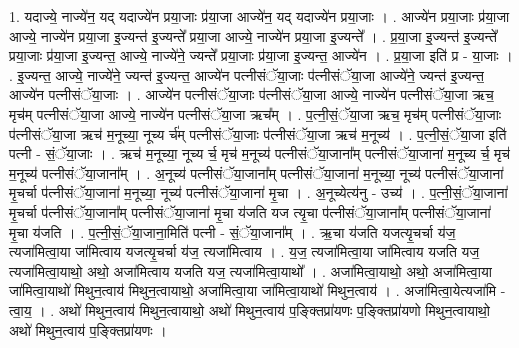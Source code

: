 \documentclass[17pt]{extarticle}
\begin{document}
1. यदाज्ये॒ नाज्ये॑न॒ यद् यदाज्ये॑न प्रया॒जाः प्र॑या॒जा आज्ये॑न॒ यद् यदाज्ये॑न प्रया॒जाः । . आज्ये॑न प्रया॒जाः प्र॑या॒जा आज्ये॒ नाज्ये॑न प्रया॒जा इ॒ज्यन्त॑ इ॒ज्यन्ते᳚ प्रया॒जा आज्ये॒ नाज्ये॑न प्रया॒जा इ॒ज्यन्ते᳚ । . प्र॒या॒जा इ॒ज्यन्त॑ इ॒ज्यन्ते᳚ प्रया॒जाः प्र॑या॒जा इ॒ज्यन्त॒ आज्ये॒ नाज्ये॑ने॒ ज्यन्ते᳚ प्रया॒जाः प्र॑या॒जा इ॒ज्यन्त॒ आज्ये॑न । . प्र॒या॒जा इति॑ प्र - या॒जाः । . इ॒ज्यन्त॒ आज्ये॒ नाज्ये॑ने॒ ज्यन्त॑ इ॒ज्यन्त॒ आज्ये॑न पत्नीसंॅया॒जाः प॑त्नीसंॅया॒जा आज्ये॑ने॒ ज्यन्त॑ इ॒ज्यन्त॒ आज्ये॑न पत्नीसंॅया॒जाः । . आज्ये॑न पत्नीसंॅया॒जाः प॑त्नीसंॅया॒जा आज्ये॒ नाज्ये॑न पत्नीसंॅया॒जा ऋच॒ मृच॑म् पत्नीसंॅया॒जा आज्ये॒ नाज्ये॑न पत्नीसंॅया॒जा ऋच᳚म् । . प॒त्नी॒सं॒ॅया॒जा ऋच॒ मृच॑म् पत्नीसंॅया॒जाः प॑त्नीसंॅया॒जा ऋच॑ म॒नूच्या॒ नूच्य र्च॑म् पत्नीसंॅया॒जाः प॑त्नीसंॅया॒जा ऋच॑ म॒नूच्य॑ । . प॒त्नी॒सं॒ॅया॒जा इति॑ पत्नी - सं॒ॅया॒जाः । . ऋच॑ म॒नूच्या॒ नूच्य र्च॒ मृच॑ म॒नूच्य॑ पत्नीसंॅया॒जाना᳚म् पत्नीसंॅया॒जाना॑ म॒नूच्य र्च॒ मृच॑ म॒नूच्य॑ पत्नीसंॅया॒जाना᳚म् । . अ॒नूच्य॑ पत्नीसंॅया॒जाना᳚म् पत्नीसंॅया॒जाना॑ म॒नूच्या॒ नूच्य॑ पत्नीसंॅया॒जाना॑ मृ॒चर्चा प॑त्नीसंॅया॒जाना॑ म॒नूच्या॒ नूच्य॑ पत्नीसंॅया॒जाना॑ मृ॒चा । . अ॒नूच्येत्य॑नु - उच्य॑ । . प॒त्नी॒सं॒ॅया॒जाना॑ मृ॒चर्चा प॑त्नीसंॅया॒जाना᳚म् पत्नीसंॅया॒जाना॑ मृ॒चा य॑जति यज त्यृ॒चा प॑त्नीसंॅया॒जाना᳚म् पत्नीसंॅया॒जाना॑ मृ॒चा य॑जति । . प॒त्नी॒सं॒ॅया॒जाना॒मिति॑ पत्नी - सं॒ॅया॒जाना᳚म् । . ऋ॒चा य॑जति यजत्यृ॒चर्चा य॑ज॒ त्यजा॑मित्वा॒या जा॑मित्वाय यजत्यृ॒चर्चा य॑ज॒ त्यजा॑मित्वाय । . य॒ज॒ त्यजा॑मित्वा॒या जा॑मित्वाय यजति यज॒ त्यजा॑मित्वा॒याथो॒ अथो॒ अजा॑मित्वाय यजति यज॒ त्यजा॑मित्वा॒याथो᳚ । . अजा॑मित्वा॒याथो॒ अथो॒ अजा॑मित्वा॒या जा॑मित्वा॒याथो॑ मिथुन॒त्वाय॑ मिथुन॒त्वायाथो॒ अजा॑मित्वा॒या जा॑मित्वा॒याथो॑ मिथुन॒त्वाय॑ । . अजा॑मित्वा॒येत्यजा॑मि - त्वा॒य॒ । . अथो॑ मिथुन॒त्वाय॑ मिथुन॒त्वायाथो॒ अथो॑ मिथुन॒त्वाय॑ प॒ङ्क्तिप्रा॑यणः प॒ङ्क्तिप्रा॑यणो मिथुन॒त्वायाथो॒ अथो॑ मिथुन॒त्वाय॑ प॒ङ्क्तिप्रा॑यणः । \newline
\end{document}
